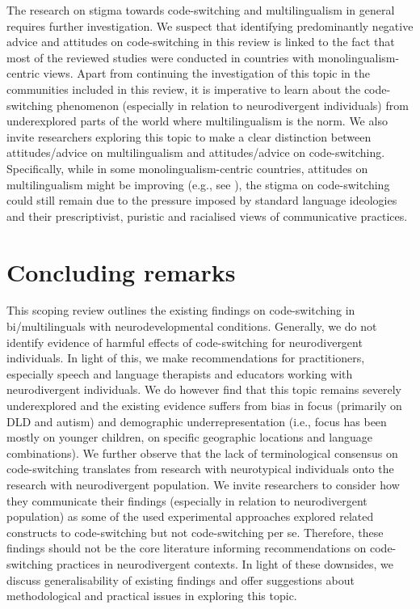 \documentclass[output=paper]{langscibook}
\begin{document}
The research on stigma towards code-switching and multilingualism in general requires further investigation. We suspect that identifying predominantly negative advice and attitudes on code-switching in this review is linked to the fact that most of the reviewed studies were conducted in countries with monolingualism-centric views. Apart from continuing the investigation of this topic in the communities included in this review, it is imperative to learn about the code-switching phenomenon (especially in relation to neurodivergent individuals) from underexplored parts of the world where multilingualism is the norm. We also invite researchers exploring this topic to make a clear distinction between attitudes/advice on multilingualism and attitudes/advice on code-switching. Specifically, while in some monolingualism-centric countries, attitudes on multilingualism might be improving (e.g., see \citealt{DigardEtAl2023}), the stigma on code-switching could still remain due to the pressure imposed by standard language ideologies and their prescriptivist, puristic and racialised views of communicative practices.

\section{Concluding remarks}

This scoping review outlines the existing findings on code-switching in bi{\slash}multilinguals with neurodevelopmental conditions. Generally, we do not identify evidence of harmful effects of code-switching for neurodivergent individuals. In light of this, we make recommendations for practitioners, especially speech and language therapists and educators working with neurodivergent individuals. We do however find that this topic remains severely underexplored and the existing evidence suffers from bias in focus (primarily on DLD and autism) and demographic underrepresentation (i.e., focus has been mostly on younger children, on specific geographic locations and language combinations). We further observe that the lack of terminological consensus on code-switching translates from research with neurotypical individuals onto the research with neurodivergent population. We invite researchers to consider how they communicate their findings (especially in relation to neurodivergent population) as some of the used experimental approaches explored related constructs to code-switching but not code-switching per se. Therefore, these findings should not be the core literature informing recommendations on code-switching practices in neurodivergent contexts. In light of these downsides, we discuss generalisability of existing findings and offer suggestions about methodological and practical issues in exploring this topic.
\end{document}
